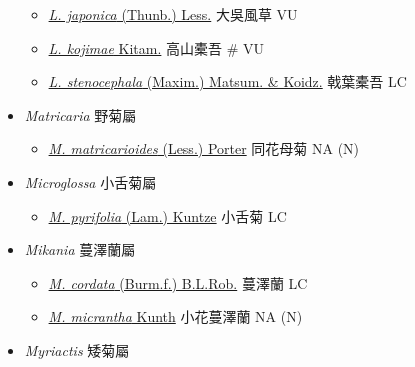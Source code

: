 \begin{itemize}
  \begin{itemize}
        \item[] \href{http://www.theplantlist.org/tpl1.1/search?q=Ligularia+japonica}{\textit{L. japonica} (Thunb.) Less.}   大吳風草   VU
        \item[] \href{http://www.theplantlist.org/tpl1.1/search?q=Ligularia+kojimae}{\textit{L. kojimae} Kitam.}   高山橐吾  \# VU
        \item[] \href{http://www.theplantlist.org/tpl1.1/search?q=Ligularia+stenocephala}{\textit{L. stenocephala} (Maxim.) Matsum. \& Koidz.}   戟葉橐吾   LC
  \end{itemize}
 \item[] \textit{Matricaria} 野菊屬
                                
  \begin{itemize}
        \item[] \href{http://www.theplantlist.org/tpl1.1/search?q=Matricaria+matricarioides}{\textit{M. matricarioides} (Less.) Porter}   同花母菊   NA (N)
  \end{itemize}
 \item[] \textit{Microglossa} 小舌菊屬
                                
  \begin{itemize}
        \item[] \href{http://www.theplantlist.org/tpl1.1/search?q=Microglossa+pyrifolia}{\textit{M. pyrifolia} (Lam.) Kuntze}   小舌菊   LC
  \end{itemize}
 \item[] \textit{Mikania} 蔓澤蘭屬
                                
  \begin{itemize}
        \item[] \href{http://www.theplantlist.org/tpl1.1/search?q=Mikania+cordata}{\textit{M. cordata} (Burm.f.) B.L.Rob.}   蔓澤蘭   LC
        \item[] \href{http://www.theplantlist.org/tpl1.1/search?q=Mikania+micrantha}{\textit{M. micrantha} Kunth}   小花蔓澤蘭   NA (N)
  \end{itemize}
 \item[] \textit{Myriactis} 矮菊屬
                                

\end{itemize}
